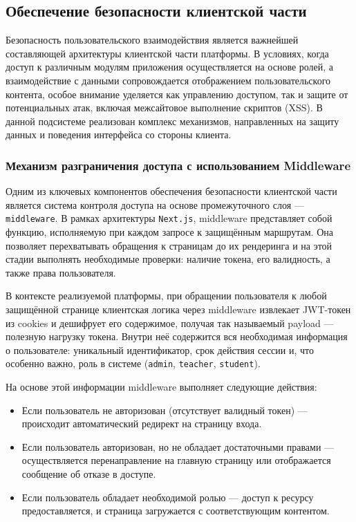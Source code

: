 \subsection{Обеспечение безопасности клиентской части}

Безопасность пользовательского взаимодействия является важнейшей составляющей архитектуры клиентской части платформы. В условиях, когда доступ к различным модулям приложения осуществляется на основе ролей, а взаимодействие с данными сопровождается отображением пользовательского контента, особое внимание уделяется как управлению доступом, так и защите от потенциальных атак, включая межсайтовое выполнение скриптов (XSS). В данной подсистеме реализован комплекс механизмов, направленных на защиту данных и поведения интерфейса со стороны клиента.

\subsubsection{Механизм разграничения доступа с использованием Middleware}

Одним из ключевых компонентов обеспечения безопасности клиентской части является система контроля доступа на основе промежуточного слоя — \texttt{middleware}. В рамках архитектуры \texttt{Next.js}, middleware представляет собой функцию, исполняемую при каждом запросе к защищённым маршрутам. Она позволяет перехватывать обращения к страницам до их рендеринга и на этой стадии выполнять необходимые проверки: наличие токена, его валидность, а также права пользователя.

В контексте реализуемой платформы, при обращении пользователя к любой защищённой странице клиентская логика через middleware извлекает JWT-токен из cookies и дешифрует его содержимое, получая так называемый payload — полезную нагрузку токена. Внутри неё содержится вся необходимая информация о пользователе: уникальный идентификатор, срок действия сессии и, что особенно важно, роль в системе (\texttt{admin}, \texttt{teacher}, \texttt{student}).

На основе этой информации middleware выполняет следующие действия:
\begin{itemize}
  \item Если пользователь не авторизован (отсутствует валидный токен) — происходит автоматический редирект на страницу входа.
  \item Если пользователь авторизован, но не обладает достаточными правами — осуществляется перенаправление на главную страницу или отображается сообщение об отказе в доступе.
  \item Если пользователь обладает необходимой ролью — доступ к ресурсу предоставляется, и страница загружается с соответствующим контентом.
\end{itemize}

